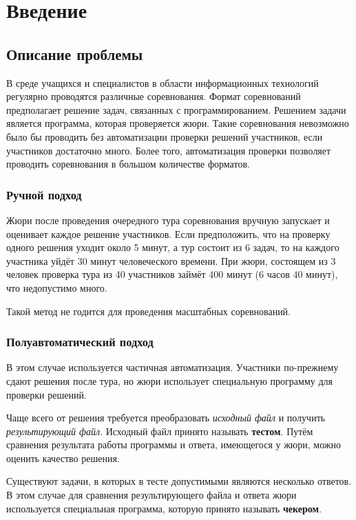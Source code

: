 \chapter{Введение}

\section{Описание проблемы}
В среде учащихся и специалистов в области информационных технологий
регулярно проводятся различные соревнования. Формат соревнований предполагает решение задач,
связанных с программированием. Решением задачи является программа, которая проверяется жюри.
Такие соревнования невозможно было бы проводить без автоматизации проверки решений участников,
если участников достаточно много. Более того, автоматизация проверки позволяет проводить соревнования
в большом количестве форматов.

\subsection{Ручной подход}
Жюри после проведения очередного тура соревнования
вручную запускает и оценивает каждое решение участников. Если предположить, что
на проверку одного решения уходит около 5 минут, а тур состоит из 6 задач, то на каждого
участника уйдёт 30 минут человеческого времени. При жюри, состоящем из 3 человек
проверка тура из 40 участников займёт 400 минут (6 часов 40 минут), что недопустимо много.

Такой метод не годится для проведения масштабных соревнований.

\subsection{Полуавтоматический подход}
В этом случае используется частичная автоматизация. Участники по-прежнему сдают решения
после тура, но жюри использует специальную программу для проверки решений.

Чаще всего от решения требуется преобразовать \textit{исходный файл} и получить \textit{результирующий файл}.
Исходный файл принято называть \textbf{тестом}. Путём сравнения результата работы программы
и ответа, имеющегося у жюри, можно оценить качество решения.

Существуют задачи, в которых в тесте допустимыми являются несколько ответов.
В этом случае для сравнения результирующего файла и ответа жюри используется
специальная программа, которую принято называть \textbf{чекером}.

